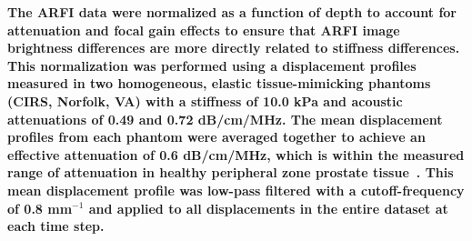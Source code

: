\textbf{The ARFI data were normalized as a function of depth to account for   
attenuation and focal gain effects to ensure that ARFI image brightness
differences are more directly related to stiffness differences.  This                
normalization was performed using a displacement profiles measured in two            
homogeneous, elastic tissue-mimicking phantoms (CIRS, Norfolk, VA) with a          
stiffness of 10.0 kPa and acoustic attenuations of 0.49 and 0.72 dB/cm/MHz.        
The mean displacement profiles from each phantom were averaged together to
achieve an effective attenuation of 0.6 dB/cm/MHz, which is within the measured
range of attenuation in healthy peripheral zone prostate
tissue~\cite{Parker1993}.  This mean displacement profile was low-pass filtered
with a cutoff-frequency of 0.8 mm$^{-1}$ and applied to all displacements in
the entire dataset at each time step.}
